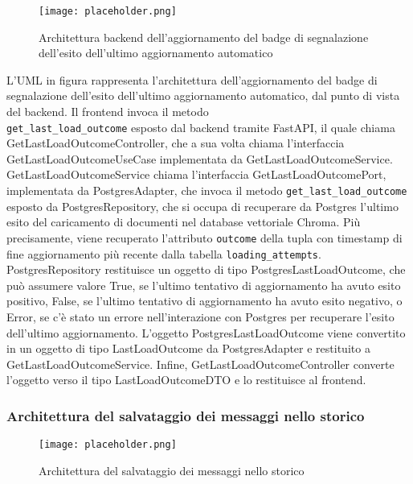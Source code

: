 \begin{figure}[h]
    \centering
    \texttt{[image: placeholder.png]}
    \caption{Architettura backend dell’aggiornamento del badge di segnalazione dell’esito dell’ultimo aggiornamento automatico}
\end{figure}

L'UML in figura rappresenta l'architettura dell'aggiornamento del badge di segnalazione dell'esito dell'ultimo aggiornamento automatico, dal punto di vista del backend. Il frontend invoca il metodo\\ \texttt{get\_last\_load\_outcome} esposto dal backend tramite FastAPI, il quale chiama GetLastLoadOutcomeController, che a sua volta chiama l'interfaccia GetLastLoadOutcomeUseCase implementata da GetLastLoadOutcomeService. GetLastLoadOutcomeService chiama l'interfaccia GetLastLoadOutcomePort, implementata da PostgresAdapter, che invoca il metodo \texttt{get\_last\_load\_outcome} esposto da PostgresRepository, che si occupa di recuperare da Postgres l'ultimo esito del caricamento di documenti nel database vettoriale Chroma. Più precisamente, viene recuperato l'attributo \texttt{outcome} della tupla con timestamp di fine aggiornamento più recente dalla tabella \texttt{loading\_attempts}. PostgresRepository restituisce un oggetto di tipo PostgresLastLoadOutcome, che può assumere valore True, se l'ultimo tentativo di aggiornamento ha avuto esito positivo, False, se l'ultimo tentativo di aggiornamento ha avuto esito negativo, o Error, se c'è stato un errore nell'interazione con Postgres per recuperare l'esito dell'ultimo aggiornamento. L'oggetto PostgresLastLoadOutcome viene convertito in un oggetto di tipo LastLoadOutcome da PostgresAdapter e restituito a GetLastLoadOutcomeService. Infine, GetLastLoadOutcomeController converte l'oggetto verso il tipo LastLoadOutcomeDTO e lo restituisce al frontend.

\newpage


\subsubsection{Architettura del salvataggio dei messaggi nello storico}
\label{sec:architettura_salvataggio_messaggi_storico}

\begin{figure}[h]
    \centering
    \texttt{[image: placeholder.png]}
    \caption{Architettura del salvataggio dei messaggi nello storico}
\end{figure}

